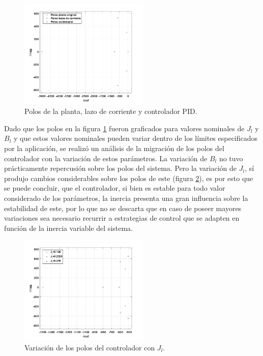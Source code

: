 \documentclass[10pt]{article}
\begin{document}
	\begin{figure}[!h]
	\centering
	\includegraphics[width=0.55\textwidth]{Polosmodelos.png}
	\caption{\label{fig:Polosmodelos}Polos de la planta, lazo de corriente y controlador PID.}
	\end{figure}
	
	Dado que los polos en la figura \ref{fig:Polosmodelos} fueron graficados para valores nominales de $J_{l}$ y $B_{l}$ y que estos valores nominales pueden variar dentro de los límites especificados por la aplicación, se realizó un análisis de la migración de los polos del controlador con la variación de estos parámetros.
	La variación de $B_{l}$ no tuvo prácticamente repercusión sobre los polos del sistema.
	Pero la variación de $J_{l}$, sí produjo cambios considerables sobre los polos de este (figura \ref{fig:PoloJeq}), es por esto que se puede concluir, que el controlador, si bien es estable para todo valor considerado de los parámetros, la inercia presenta una gran influencia sobre la estabilidad de este, por lo que no se descarta que en caso de poseer mayores variaciones sea necesario recurrir a estrategias de control que se adapten en función de la inercia variable del sistema.
	\begin{figure}[h!]
	\centering
	\includegraphics[width=0.55\textwidth]{PoloJeq.png}
	\caption{\label{fig:PoloJeq}Variación de los polos del controlador con $J_{l}$.}
	\end{figure}
	
\end{document}
